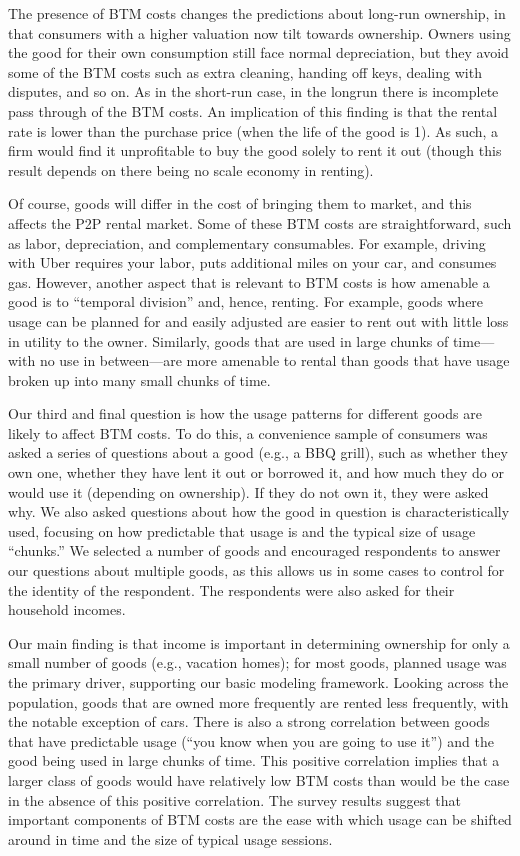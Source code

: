 \documentclass[11pt]{article}
\begin{document}
The presence of BTM costs changes the predictions about long-run ownership, in that consumers with a higher valuation now tilt towards ownership.
Owners using the good for their own consumption still face normal depreciation, but they avoid some of the BTM costs such as extra cleaning, handing off keys, dealing with disputes, and so on. 
As in the short-run case, in the longrun there is incomplete pass through of the BTM costs.
An implication of this finding is that the rental rate is lower than the purchase price (when the life of the good is 1).
As such, a firm would find it unprofitable to buy the good solely to rent it out (though this result depends on there being no scale economy in renting). 

Of course, goods will differ in the cost of bringing them to market, and this affects the P2P rental market. 
Some of these BTM costs are straightforward, such as labor, depreciation, and complementary consumables.
For example, driving with Uber requires your labor, puts additional miles on your car, and consumes gas.
However, another aspect that is relevant to BTM costs is how amenable a good is to ``temporal division'' and, hence, renting.
For example, goods where usage can be planned for and easily adjusted are easier to rent out with little loss in utility to the owner. 
Similarly, goods that are used in large chunks of time---with no use in between---are more amenable to rental than goods that have usage broken up into many small chunks of time.

Our third and final question is how the usage patterns for different goods are likely to affect BTM costs.
To do this, a convenience sample of consumers was asked a series of questions about a good (e.g., a BBQ grill), such as whether they own one, whether they have lent it out or borrowed it, and how much they do or would use it (depending on ownership). 
If they do not own it, they were asked why. 
We also asked questions about how the good in question is characteristically used, focusing on how predictable that usage is and the typical size of usage ``chunks.''  
We selected a number of goods and encouraged respondents to answer our questions about multiple goods, as this allows us in some cases to control for the identity of the respondent. 
The respondents were also asked for their household incomes.

Our main finding is that income is important in determining ownership for only a small number of goods (e.g., vacation homes); 
for most goods, planned usage was the primary driver, supporting our basic modeling framework.  
Looking across the population, goods that are owned more frequently are rented less frequently, with the notable exception of cars.
There is also a strong correlation between goods that have predictable usage (``you know when you are going to use it'') and the good being used in large chunks of time.
This positive correlation implies that a larger class of goods would have relatively low BTM costs than would be the case in the absence of this positive correlation. 
The survey results suggest that important components of BTM costs are the ease with which usage can be shifted around in time and the size of typical usage sessions.
\end{document}
